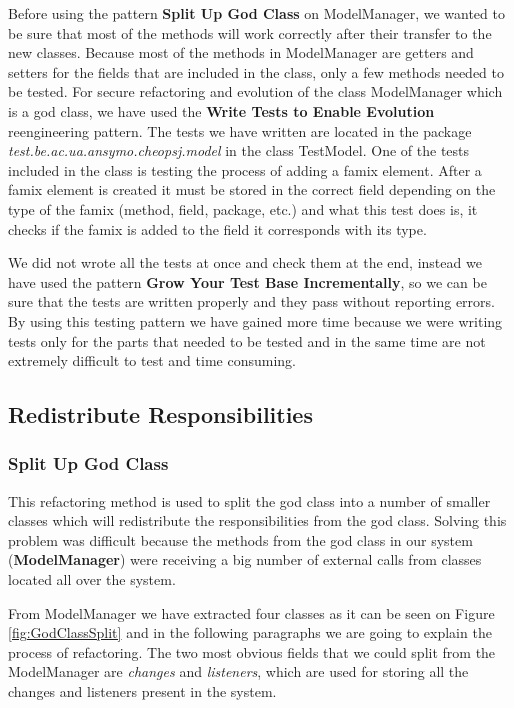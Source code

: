 \documentclass{article}
\begin{document}
Before using the pattern \textbf{Split Up God Class} on ModelManager, we wanted to be sure that most of the methods will work correctly after their transfer to the new classes. Because most of the methods in ModelManager are getters and setters for the fields that are included in the class, only a few methods needed to be tested. For secure refactoring and evolution of the class ModelManager which is a god class, we have used the \textbf{Write Tests to Enable Evolution} reengineering pattern. The tests we have written are located in the package \emph{test.be.ac.ua.ansymo.cheopsj.model} in the class TestModel. One of the tests included in the class is testing the process of adding a famix element. After a famix element is created it must be stored in the correct field depending on the type of the famix (method, field, package, etc.) and what this test does is, it checks if the famix is added to the field it corresponds with its type.

We did not wrote all the tests at once and check them at the end, instead we have used the pattern \textbf{Grow Your Test Base Incrementally}, so we can be sure that the tests are written properly and they pass without reporting errors. By using this testing pattern we have gained more time because we were writing tests only for the parts that needed to be tested and in the same time are not extremely difficult to test and time consuming.

\subsection{Redistribute Responsibilities}

\subsubsection{Split Up God Class}
This refactoring method is used to split the god class into a number of smaller classes which will redistribute the responsibilities from the god class. Solving this problem was difficult because the methods from the god class in our system (\textbf{ModelManager}) were receiving a big number of external calls from classes located all over the system.

From ModelManager we have extracted four classes as it can be seen on Figure \ref{fig:GodClassSplit} and in the following paragraphs we are going to explain the process of refactoring. The two most obvious fields that we could split from the ModelManager are \emph{changes} and \emph{listeners}, which are used for storing all the changes and listeners present in the system.
\end{document}
